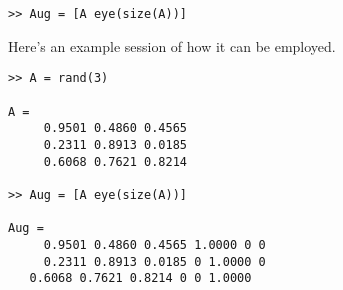 \documentclass[../main.tex]{subfiles}
\begin{document}
\chapter{}
\label{cha:cha_7}


\section{}
\begin{lstlisting}[numbers=none]
>> Aug = [A eye(size(A))]
\end{lstlisting}
\bigbreak
Here’s an example session of how it can be employed.
\bigbreak
\begin{lstlisting}[numbers=none]
>> A = rand(3)

A =
	 0.9501 0.4860 0.4565
	 0.2311 0.8913 0.0185
 	 0.6068 0.7621 0.8214
 
>> Aug = [A eye(size(A))]

Aug =
 	 0.9501 0.4860 0.4565 1.0000 0 0
 	 0.2311 0.8913 0.0185 0 1.0000 0
   0.6068 0.7621 0.8214 0 0 1.0000 
\end{lstlisting}
\bigbreak
\end{document}
